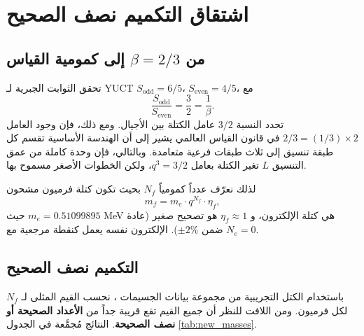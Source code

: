 \documentclass[12pt,a4paper]{article}
\newcommand{\Sodd}{S_{\mathrm{odd}}}
\newcommand{\Seven}{S_{\mathrm{even}}}
\begin{document}
	\section{اشتقاق التكميم نصف الصحيح}
	
	\subsection{من \(\beta = 2/3\) إلى كمومية القياس}
	
	تحقق الثوابت الجبرية لـ YUCT \(\Sodd = 6/5\)، \(\Seven = 4/5\)، مع
	\[
	\frac{\Sodd}{\Seven} = \frac{3}{2} = \frac{1}{\beta}.
	\]
	تحدد النسبة \(3/2\) عامل الكتلة بين الأجيال. ومع ذلك، فإن وجود العامل \(2/3 = (1/3) \times 2\) في قانون القياس العالمي يشير إلى أن الهندسة الأساسية تقسم كل طبقة تنسيق إلى ثلاث طبقات فرعية متعامدة. وبالتالي، فإن وحدة كاملة من عمق التنسيق \(L\) تغير الكتلة بعامل \(q^3 = 3/2\)، ولكن الخطوات الأصغر مسموح بها.
	
	لذلك نعرّف عدداً كمومياً \(N_f\) بحيث تكون كتلة فرميون مشحون
	\begin{equation}
		m_f = m_e \cdot q^{N_f} \cdot \eta_f,
		\label{eq:new}
	\end{equation}
	حيث \(m_e = 0.51099895\) MeV هي كتلة الإلكترون، و \(\eta_f \approx 1\) هو تصحيح صغير (عادة ضمن \(\pm 2\%\)). الإلكترون نفسه يعمل كنقطة مرجعية مع \(N_e = 0\).
	
	\subsection{التكميم نصف الصحيح}
	
	باستخدام الكتل التجريبية من مجموعة بيانات الجسيمات \cite{PDG2024}، نحسب القيم المثلى لـ \(N_f\) لكل فرميون. ومن اللافت للنظر أن جميع القيم تقع قريبة جداً من \textbf{الأعداد الصحيحة أو نصف الصحيحة}. النتائج مُجمَّعة في الجدول \ref{tab:new_masses}.
	
\end{document}
